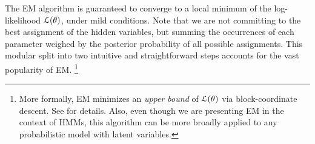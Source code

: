 The EM algorithm is guaranteed to
converge to a local minimum of the log-likelihood $\mathcal{L}(\theta)$, under mild
conditions.  
Note that we are not committing to the best assignment of the hidden variables, but
summing the occurrences of each parameter weighed by the posterior
probability of all possible assignments. 
This modular split into two intuitive and straightforward steps
accounts for the vast popularity of EM.%
\footnote{More formally, EM minimizes an \emph{upper bound} of $\mathcal{L}(\theta)$ via block-coordinate descent. See \citet{Neal1998} for details. Also, even though we are presenting EM in the context of HMMs, this algorithm can be more broadly applied to any probabilistic model with latent variables.} %

